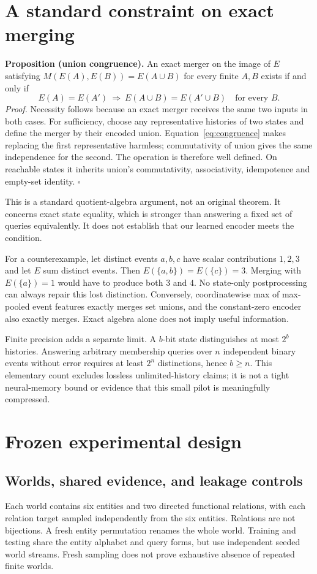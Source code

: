\documentclass[10pt]{article}
\begin{document}
\section{A standard constraint on exact merging}
\textbf{Proposition (union congruence).} An exact merger on the image of $E$
satisfying $M(E(A),E(B))=E(A\cup B)$ for every finite $A,B$ exists if and only if
\begin{equation}
E(A)=E(A')\ \Longrightarrow\ E(A\cup B)=E(A'\cup B)
\quad\text{for every } B.
\label{eq:congruence}
\end{equation}
\emph{Proof.} Necessity follows because an exact merger receives the same two
inputs in both cases. For sufficiency, choose any representative histories of
two states and define the merger by their encoded union. Equation~\ref{eq:congruence}
makes replacing the first representative harmless; commutativity of union gives
the same independence for the second. The operation is therefore well defined.
On reachable states it inherits union's commutativity, associativity,
idempotence and empty-set identity. $\square$

This is a standard quotient-algebra argument, not an original theorem.
It concerns exact state equality, which is stronger than answering a fixed set
of queries equivalently. It does not establish that our learned encoder meets
the condition.

For a counterexample, let distinct events $a,b,c$ have scalar contributions
$1,2,3$ and let $E$ sum distinct events. Then $E(\{a,b\})=E(\{c\})=3$.
Merging with $E(\{a\})=1$ would have to produce both $3$ and $4$.
No state-only postprocessing can always repair this lost distinction.
Conversely, coordinatewise max of max-pooled event features exactly merges
set unions, and the constant-zero encoder also exactly merges. Exact algebra
alone does not imply useful information.

Finite precision adds a separate limit. A $b$-bit state distinguishes at most
$2^b$ histories. Answering arbitrary membership queries over $n$ independent
binary events without error requires at least $2^n$ distinctions, hence
$b\geq n$. This elementary count excludes lossless unlimited-history claims;
it is not a tight neural-memory bound or evidence that this small pilot is
meaningfully compressed.

\section{Frozen experimental design}
\subsection{Worlds, shared evidence, and leakage controls}
Each world contains six entities and two directed functional relations, with
each relation target sampled independently from the six entities. Relations
are not bijections. A fresh entity permutation renames the whole world.
Training and testing share the entity alphabet and query forms, but use
independent seeded world streams. Fresh sampling does not prove exhaustive
absence of repeated finite worlds.
\end{document}
